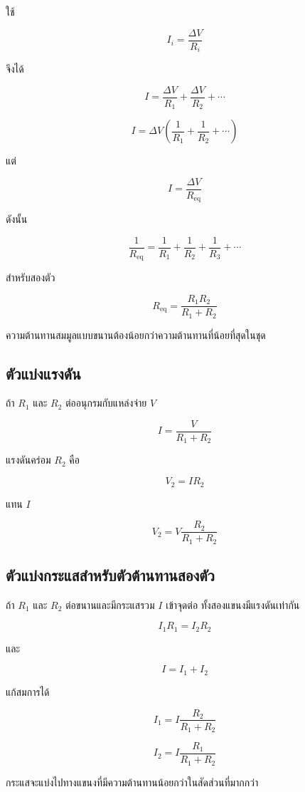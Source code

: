ใช้

\[
I_i=\frac{\Delta V}{R_i}
\]

จึงได้

\[
I=\frac{\Delta V}{R_1}+\frac{\Delta V}{R_2}+\cdots
\]

\[
I=\Delta V\left(\frac{1}{R_1}+\frac{1}{R_2}+\cdots\right)
\]

แต่

\[
I=\frac{\Delta V}{R_{\text{eq}}}
\]

ดังนั้น

\begin{tcolorbox}[title={ตัวต้านทานต่อขนาน}]
\[
\boxed{\frac{1}{R_{\text{eq}}}
=\frac{1}{R_1}+\frac{1}{R_2}+\frac{1}{R_3}+\cdots}
\]
\end{tcolorbox}

สำหรับสองตัว

\[
\boxed{R_{\text{eq}}=\frac{R_1R_2}{R_1+R_2}}
\]

ความต้านทานสมมูลแบบขนานต้องน้อยกว่าความต้านทานที่น้อยที่สุดในชุด

\subsection{ตัวแบ่งแรงดัน}

ถ้า $R_1$ และ $R_2$ ต่ออนุกรมกับแหล่งจ่าย $V$

\[
I=\frac{V}{R_1+R_2}
\]

แรงดันคร่อม $R_2$ คือ

\[
V_2=IR_2
\]

แทน $I$

\begin{tcolorbox}[title={ตัวแบ่งแรงดัน}]
\[
\boxed{V_2=V\frac{R_2}{R_1+R_2}}
\]
\end{tcolorbox}

\subsection{ตัวแบ่งกระแสสำหรับตัวต้านทานสองตัว}

ถ้า $R_1$ และ $R_2$ ต่อขนานและมีกระแสรวม $I$ เข้าจุดต่อ ทั้งสองแขนงมีแรงดันเท่ากัน

\[
I_1R_1=I_2R_2
\]

และ

\[
I=I_1+I_2
\]

แก้สมการได้

\[
\boxed{I_1=I\frac{R_2}{R_1+R_2}}
\]

\[
\boxed{I_2=I\frac{R_1}{R_1+R_2}}
\]

กระแสจะแบ่งไปทางแขนงที่มีความต้านทานน้อยกว่าในสัดส่วนที่มากกว่า


